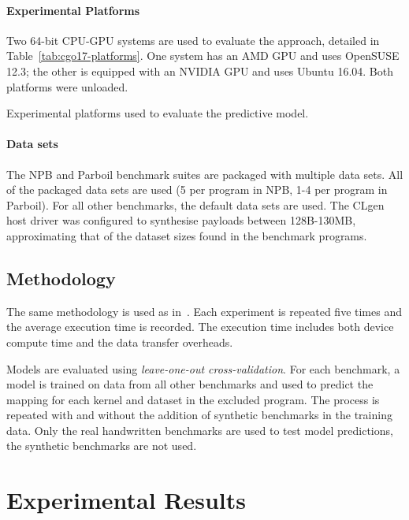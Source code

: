\paragraph*{Experimental Platforms}

Two 64-bit CPU-GPU systems are used to evaluate the approach, detailed in Table~\ref{tab:cgo17-platforms}. One system has an AMD GPU and uses OpenSUSE 12.3; the other is equipped with an NVIDIA GPU and uses Ubuntu 16.04. Both platforms were unloaded.

\begin{table}
  \centering %
  
  \caption[Experimental platforms used in evaluation]{Experimental platforms used to evaluate the \citeauthor{Grewe2013} predictive model.}
  \label{tab:cgo17-platforms}
\end{table}


\paragraph*{Data sets}

The NPB and Parboil benchmark suites are packaged with multiple data sets. All of the packaged data sets are used (5 per program in NPB, 1-4 per program in Parboil). For all other benchmarks, the default data sets are used. The CLgen host driver was configured to synthesise payloads between 128B-130MB, approximating that of the dataset sizes found in the benchmark programs.


\subsection{Methodology}

The same methodology is used as in~\cite{Grewe2013}. Each experiment is repeated five times and the average execution time is recorded. The execution time includes both device compute time and the data transfer overheads.

Models are evaluated using \emph{leave-one-out cross-validation}. For each benchmark, a model is trained on data from all other benchmarks and used to predict the mapping for each kernel and dataset in the excluded program. The process is repeated with and without the addition of synthetic benchmarks in the training data. Only the real handwritten benchmarks are used to test model predictions, the synthetic benchmarks are not used.


\section{Experimental Results}
\label{sec:clgen-eval-results}

